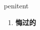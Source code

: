
\begin{frame}
{\huge penitent}
\begin{center}
\begin{enumerate}\Large
  \item \textbf{悔过的}
\end{enumerate}
\end{center}
\end{frame}
